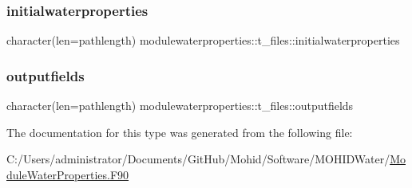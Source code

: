 \mbox{\label{structmodulewaterproperties_1_1t__files_a28c144a3528134842524c81b16090dfc}} 
\subsubsection{\texorpdfstring{initialwaterproperties}{initialwaterproperties}}
{\footnotesize\ttfamily character(len=pathlength) modulewaterproperties\+::t\+\_\+files\+::initialwaterproperties\hspace{0.3cm}{\ttfamily [private]}}

\mbox{\label{structmodulewaterproperties_1_1t__files_a2143f9132a2ba51231006e6b5ebe5441}} 
\subsubsection{\texorpdfstring{outputfields}{outputfields}}
{\footnotesize\ttfamily character(len=pathlength) modulewaterproperties\+::t\+\_\+files\+::outputfields\hspace{0.3cm}{\ttfamily [private]}}



The documentation for this type was generated from the following file\+:\begin{DoxyCompactItemize}
\item 
C\+:/\+Users/administrator/\+Documents/\+Git\+Hub/\+Mohid/\+Software/\+M\+O\+H\+I\+D\+Water/\mbox{\hyperlink{_module_water_properties_8_f90}{Module\+Water\+Properties.\+F90}}\end{DoxyCompactItemize}
